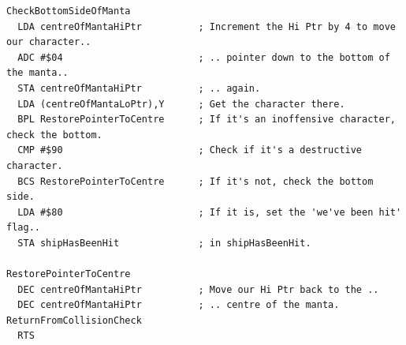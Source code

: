 \begin{lstlisting}[basicstyle=\scriptsize\ttfamily]
CheckBottomSideOfManta
  LDA centreOfMantaHiPtr          ; Increment the Hi Ptr by 4 to move our character..
  ADC #$04                        ; .. pointer down to the bottom of the manta..
  STA centreOfMantaHiPtr          ; .. again.
  LDA (centreOfMantaLoPtr),Y      ; Get the character there.
  BPL RestorePointerToCentre      ; If it's an inoffensive character, check the bottom.
  CMP #$90                        ; Check if it's a destructive character.
  BCS RestorePointerToCentre      ; If it's not, check the bottom side.
  LDA #$80                        ; If it is, set the 'we've been hit' flag..
  STA shipHasBeenHit              ; in shipHasBeenHit.

RestorePointerToCentre
  DEC centreOfMantaHiPtr          ; Move our Hi Ptr back to the ..
  DEC centreOfMantaHiPtr          ; .. centre of the manta.
ReturnFromCollisionCheck
  RTS
\end{lstlisting}
